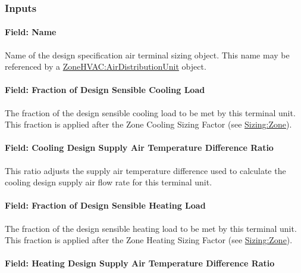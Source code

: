 \subsubsection{Inputs}\label{inputs-52-007}

\paragraph{Field: Name}\label{designspecificationairterminalsizing-field-name}

Name of the design specification air terminal sizing object. This name may be referenced by a \hyperref[zonehvacairdistributionunit]{ZoneHVAC:AirDistributionUnit} object.

\paragraph{Field: Fraction of Design Sensible Cooling Load}\label{fraction-of-design-sensible-cooling-load}

The fraction of the design sensible cooling load to be met by this terminal unit. This fraction is applied after the Zone Cooling Sizing Factor (see \hyperref[sizingzone]{Sizing:Zone}).

\paragraph{Field: Cooling Design Supply Air Temperature Difference Ratio}\label{cooling-design-supply-air-temperature-difference-ratio}

This ratio adjusts the supply air temperature difference used to calculate the cooling design supply air flow rate for this terminal unit.

\paragraph{Field: Fraction of Design Sensible Heating Load}\label{fraction-of-design-sensible-heating-load}

The fraction of the design sensible heating load to be met by this terminal unit. This fraction is applied after the Zone Heating Sizing Factor (see \hyperref[sizingzone]{Sizing:Zone}).

\paragraph{Field: Heating Design Supply Air Temperature Difference Ratio}\label{heating-design-supply-air-temperature-difference-ratio}

